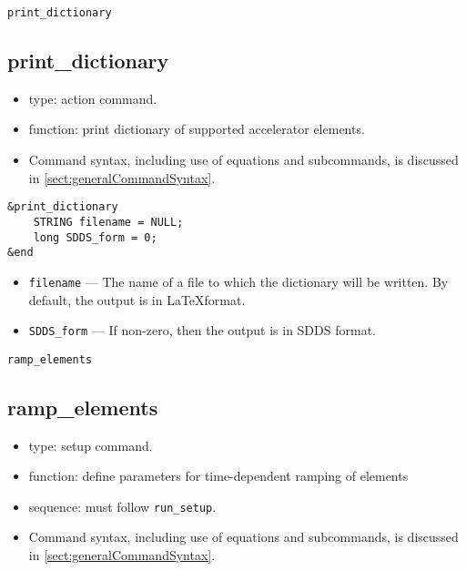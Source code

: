 \documentclass[11pt]{article}
\begin{document}
\newpage
\begin{center}{\Large\verb|print_dictionary|}\end{center}
\subsection{print\_dictionary \label{subsec:printdictionary}}

\begin{itemize}
\item type: action command.
\item function: print dictionary of supported accelerator elements.
\item Command syntax, including use of equations and subcommands, is discussed in \ref{sect:generalCommandSyntax}.
\end{itemize}

\begin{verbatim}
&print_dictionary
    STRING filename = NULL;
    long SDDS_form = 0;
&end
\end{verbatim}

\begin{itemize}
\item \verb|filename| --- The name of a file to which the dictionary will be written.  By default, the 
  output is in \LaTeX format.
\item \verb|SDDS_form| --- If non-zero, then the output is in  SDDS format.
\end{itemize}

\newpage
\begin{center}{\Large\verb|ramp_elements|}\end{center}
\subsection{ramp\_elements\label{subsec:rampelements}}

\begin{itemize}
\item type: setup command.
\item function: define parameters for time-dependent ramping of elements
\item sequence: must follow \verb|run_setup|.
\item Command syntax, including use of equations and subcommands, is discussed in \ref{sect:generalCommandSyntax}.
\end{itemize}
\end{document}
